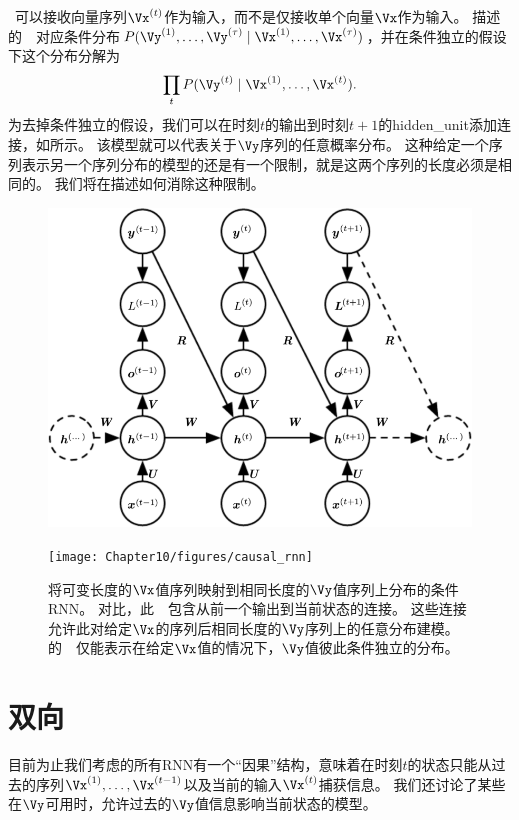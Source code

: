 
~可以接收向量序列$\Vx^{(t)}$作为输入，而不是仅接收单个向量$\Vx$作为输入。
描述的~~对应条件分布$P(\Vy^{(1)}, \dots, \Vy^{(\tau)} \mid \Vx^{(1)}, \dots, \Vx^{(\tau)})$，并在条件独立的假设下这个分布分解为
\begin{align}
 \prod_t P(\Vy^{(t)} \mid \Vx^{(1)}, \dots, \Vx^{(t)}).
\end{align}
为去掉条件独立的假设，我们可以在时刻$t$的输出到时刻$t+1$的\gls{hidden_unit}添加连接，如所示。
该模型就可以代表关于$\Vy$序列的任意概率分布。
这种给定一个序列表示另一个序列分布的模型的还是有一个限制，就是这两个序列的长度必须是相同的。
我们将在描述如何消除这种限制。

\begin{figure}[!htb]
\ifOpenSource
\centerline{\includegraphics[scale=0.5]{images/98.png}}
\else
\centerline{\texttt{[image: Chapter10/figures/causal\_rnn]}}
\fi
\caption{将可变长度的$\Vx$值序列映射到相同长度的$\Vy$值序列上分布的条件\gls{RNN}。
对比，此~~包含从前一个输出到当前状态的连接。
这些连接允许此对给定$\Vx$的序列后相同长度的$\Vy$序列上的任意分布建模。
的~~仅能表示在给定$\Vx$值的情况下，$\Vy$值彼此条件独立的分布。
}
\label{fig:chap10_causal_rnn}
\end{figure}



\section{双向~}
\label{sec:bidirectional_rnns}
目前为止我们考虑的所有\gls{RNN}有一个``因果''结构，意味着在时刻$t$的状态只能从过去的序列$\Vx^{(1)},\dots,\Vx^{(t-1)}$以及当前的输入$\Vx^{(t)}$捕获信息。
我们还讨论了某些在$\Vy$可用时，允许过去的$\Vy$值信息影响当前状态的模型。

